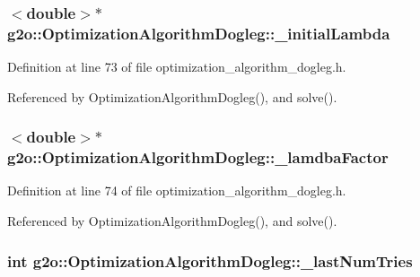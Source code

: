 \subsubsection[{\texorpdfstring{\+\_\+initial\+Lambda}{_initialLambda}}]{$<$double$>$$\ast$ g2o\+::\+Optimization\+Algorithm\+Dogleg\+::\+\_\+initial\+Lambda\hspace{0.3cm}{\ttfamily [protected]}}\hypertarget{classg2o_1_1OptimizationAlgorithmDogleg_a3a94c7696f07e3def38ec96a1979babd}{}\label{classg2o_1_1OptimizationAlgorithmDogleg_a3a94c7696f07e3def38ec96a1979babd}


Definition at line 73 of file optimization\+\_\+algorithm\+\_\+dogleg.\+h.



Referenced by Optimization\+Algorithm\+Dogleg(), and solve().

\subsubsection[{\texorpdfstring{\+\_\+lamdba\+Factor}{_lamdbaFactor}}]{$<$double$>$$\ast$ g2o\+::\+Optimization\+Algorithm\+Dogleg\+::\+\_\+lamdba\+Factor\hspace{0.3cm}{\ttfamily [protected]}}\hypertarget{classg2o_1_1OptimizationAlgorithmDogleg_a6855a511dc998efef7eaa0ef99e1b814}{}\label{classg2o_1_1OptimizationAlgorithmDogleg_a6855a511dc998efef7eaa0ef99e1b814}


Definition at line 74 of file optimization\+\_\+algorithm\+\_\+dogleg.\+h.



Referenced by Optimization\+Algorithm\+Dogleg(), and solve().

\subsubsection[{\texorpdfstring{\+\_\+last\+Num\+Tries}{_lastNumTries}}]{\setlength{\rightskip}{0pt plus 5cm}int g2o\+::\+Optimization\+Algorithm\+Dogleg\+::\+\_\+last\+Num\+Tries\hspace{0.3cm}{\ttfamily [protected]}}\hypertarget{classg2o_1_1OptimizationAlgorithmDogleg_aeab37f3f587dc8b37b5a42d36fd8217c}{}\label{classg2o_1_1OptimizationAlgorithmDogleg_aeab37f3f587dc8b37b5a42d36fd8217c}


